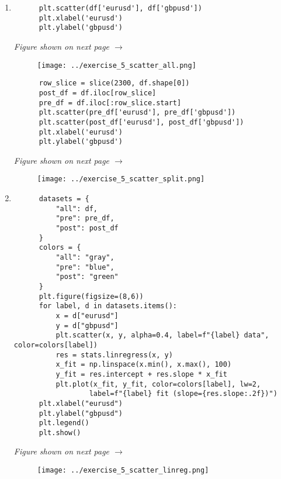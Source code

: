 \documentclass[11pt]{article}
\begin{document}
\begin{enumerate}
    \item 
    \leavevmode
      \begin{lstlisting}
      plt.scatter(df['eurusd'], df['gbpusd'])
      plt.xlabel('eurusd')
      plt.ylabel('gbpusd')
      \end{lstlisting}
    \vfill
    \begin{center}
        \textit{Figure shown on next page $\rightarrow$}
    \end{center}
    \newpage
      \begin{figure}[h!]
        \texttt{[image: ../exercise\_5\_scatter\_all.png]}
      \end{figure}
      \begin{lstlisting}
      row_slice = slice(2300, df.shape[0])
      post_df = df.iloc[row_slice]
      pre_df = df.iloc[:row_slice.start]
      plt.scatter(pre_df['eurusd'], pre_df['gbpusd'])
      plt.scatter(post_df['eurusd'], post_df['gbpusd'])
      plt.xlabel('eurusd')
      plt.ylabel('gbpusd')
      \end{lstlisting}
      \vfill
      \begin{center}
          \textit{Figure shown on next page $\rightarrow$}
      \end{center}
      \newpage
      \begin{figure}[h!]
        \texttt{[image: ../exercise\_5\_scatter\_split.png]}
      \end{figure}

    \item 
    \leavevmode
      \begin{lstlisting}
      datasets = {
          "all": df,
          "pre": pre_df,
          "post": post_df
      }
      colors = {
          "all": "gray",
          "pre": "blue",
          "post": "green"
      }
      plt.figure(figsize=(8,6))
      for label, d in datasets.items():
          x = d["eurusd"]
          y = d["gbpusd"]
          plt.scatter(x, y, alpha=0.4, label=f"{label} data", color=colors[label])
          res = stats.linregress(x, y)
          x_fit = np.linspace(x.min(), x.max(), 100)
          y_fit = res.intercept + res.slope * x_fit
          plt.plot(x_fit, y_fit, color=colors[label], lw=2,
                  label=f"{label} fit (slope={res.slope:.2f})")
      plt.xlabel("eurusd")
      plt.ylabel("gbpusd")
      plt.legend()
      plt.show()
      \end{lstlisting}
      \vfill
      \begin{center}
          \textit{Figure shown on next page $\rightarrow$}
      \end{center}
      \newpage
      \begin{figure}[h!]
        \texttt{[image: ../exercise\_5\_scatter\_linreg.png]}
      \end{figure}


\end{enumerate}
\end{document}
